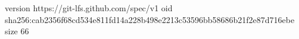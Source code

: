 version https://git-lfs.github.com/spec/v1
oid sha256:cab2356f68cd534e811fd14a228b498e2213c53596bb58686b21f2e87d716ebe
size 66
